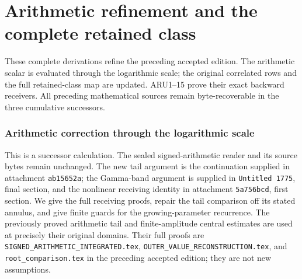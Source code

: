 \begingroup
\clearpage
\part{Arithmetic refinement and the complete retained class}
\noindent These complete derivations refine the preceding accepted edition.
The arithmetic scalar is evaluated through the logarithmic scale; the
original correlated rows and the full retained-class map are updated.
ARU1--15 prove their exact backward receivers. All preceding mathematical
sources remain byte-recoverable in the three cumulative successors.
\providecommand{\tightlist}{\setlength{\itemsep}{0pt}\setlength{\parskip}{0pt}}
\providecommand{\C}{\mathbb C}\providecommand{\R}{\mathbb R}
\providecommand{\Z}{\mathbb Z}\providecommand{\Q}{\mathbb Q}
\providecommand{\N}{\mathbb N}
\providecommand{\im}{\operatorname{im}}
\providecommand{\diag}{\operatorname{diag}}
\providecommand{\Gr}{\operatorname{Gram}}
\providecommand{\Gram}{\operatorname{Gram}}
\providecommand{\Res}{\operatorname{Res}}
\providecommand{\cond}{\operatorname{cond}}
\providecommand{\ExtensionTok}[1]{#1}\providecommand{\NormalTok}[1]{#1}
\providecommand{\StringTok}[1]{#1}\providecommand{\BuiltInTok}[1]{#1}
\providecommand{\ControlFlowTok}[1]{#1}

\clearpage
\begingroup
\def\R{\mathbb R}
\def\C{\mathbb C}
\def\PP{\mathcal P}
\def\BB{\mathcal B}
\def\dd{\,d}
\def\Tr{\operatorname{Tr}}
\def\Gram{\operatorname{Gram}}
\def\rank{\operatorname{rank}}

\setcounter{equation}{0}
\renewcommand{\theequation}{A02SR.\arabic{equation}}
\section*{Arithmetic correction through the logarithmic scale}

\noindent This is a successor calculation. The sealed signed-arithmetic reader and
its source bytes remain unchanged. The new tail argument is the continuation
supplied in attachment \texttt{ab15652a}; the Gamma-band argument is supplied in
\texttt{Untitled 1775}, final section, and the nonlinear receiving identity in
attachment \texttt{5a756bcd}, first section. We give the full receiving proofs,
repair the tail comparison off its stated annulus, and give finite guards for
the growing-parameter recurrence. The previously proved arithmetic tail and
finite-amplitude central estimates are used at precisely their original domains.
Their full proofs are \texttt{SIGNED\_ARITHMETIC\_INTEGRATED.tex},
\texttt{OUTER\_VALUE\_RECONSTRUCTION.tex}, and \texttt{root\_comparison.tex}
in the preceding accepted edition; they are not new assumptions.

